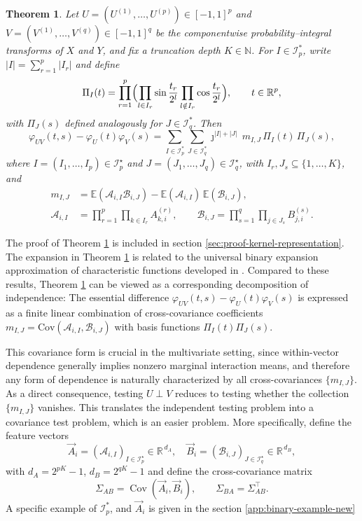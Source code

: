 \documentclass[12pt,reqno,oneside]{amsbook}
\newtheorem{theorem}{Theorem}[chapter]
\theoremstyle{definition}
\theoremstyle{remark}
\begin{document}
\begin{theorem}
\label{thm:kernel-representation}
Let $U=(U^{(1)},\dots,U^{(p)})\in[-1,1]^p$ and
$V=(V^{(1)},\dots,V^{(q)})\in[-1,1]^q$ be the componentwise
probability--integral transforms of $X$ and $Y$, and fix a truncation depth
$K\in\mathbb N$.  
For $I\in\mathcal I_p^*$, write $|I|=\sum_{r=1}^p |I_r|$ and define
\[
\Pi_I(t)
=
\prod_{r=1}^p
\Bigl(
\prod_{l\in I_r}\sin\frac{t_r}{2^l}
\prod_{l\notin I_r}\cos\frac{t_r}{2^l}
\Bigr),
\qquad t\in\mathbb R^p,
\]
with $\Pi_J(s)$ defined analogously for $J\in\mathcal I_q^*$. Then
\[
\varphi_{UV}(t,s)-\varphi_U(t)\varphi_V(s)
=
\sum_{I\in\mathcal I_p^*}\sum_{J\in\mathcal I_q^*}
\jmath^{|I|+|J|}\,
m_{I,J}\,\Pi_I(t)\,\Pi_J(s),
\]
where $I=(I_1,\ldots,I_p)\in\mathcal I_p^\star$ and $J=(J_1,\ldots,J_q)\in\mathcal I_q^\star$,
with $I_r,J_s\subseteq\{1,\ldots,K\}$, and
\[
\begin{aligned}
m_{I,J}
&=\mathbb E(\mathcal A_{i,I}\mathcal B_{i,J})
-\mathbb E(\mathcal A_{i,I})\,\mathbb E(\mathcal B_{i,J}),\\
\mathcal A_{i,I}
&=
\prod_{r=1}^p\prod_{k\in I_r} A^{(r)}_{k,i},
\qquad
\mathcal B_{i,J}
=
\prod_{s=1}^q\prod_{j\in J_s} B^{(s)}_{j,i}.
\end{aligned}
\]

\end{theorem}

The proof of Theorem \ref{thm:kernel-representation} is included in section \ref{sec:proof-kernel-representation}. 
The expansion in Theorem \ref{thm:kernel-representation} is related to the universal binary expansion approximation of characteristic functions developed in \citep{zhang2019bet,zhang2021beauty}. 
Compared to these results, Theorem \ref{thm:kernel-representation} can be viewed as a corresponding decomposition of independence: The essential difference
$\varphi_{UV}(t,s)-\varphi_U(t)\varphi_V(s)$ is expressed as a finite linear combination of cross-covariance coefficients
$m_{I,J}=\mbox{Cov}(\mathcal{A}_{i,I},\mathcal{B}_{i,J})$ with basis functions $\Pi_I(t)\Pi_J(s)$.

This covariance form is crucial in the multivariate setting, since within-vector dependence generally implies nonzero marginal interaction means, and therefore any form of dependence is naturally characterized by all cross-covariances $\{m_{I,J}\}$. 
As a direct consequence, testing $U \perp V$ reduces to testing whether the collection $\{m_{I,J}\}$ vanishes. 
This translates the independent testing problem into a covariance test problem, which is an easier problem. 
More specifically, define the feature vectors
\[
\vec A_i=(\mathcal{A}_{i,I})_{I\in\mathcal I_p^\star}\in\mathbb R^{\,d_A},
\quad
\vec B_i=(\mathcal{B}_{i,J})_{J\in\mathcal I_q^\star}\in\mathbb R^{\,d_B},
\]
with $d_A=2^{pK}-1$, $d_B=2^{qK}-1$
and define the cross-covariance matrix
\[
\Sigma_{AB}=\operatorname{Cov}(\vec A_i,\vec B_i),
\qquad
\Sigma_{BA}=\Sigma_{AB}^\top.
\]
A specific example of $\mathcal I_p^*$, and $\vec A_i$ is given in the section \ref{app:binary-example-new}
\end{document}
